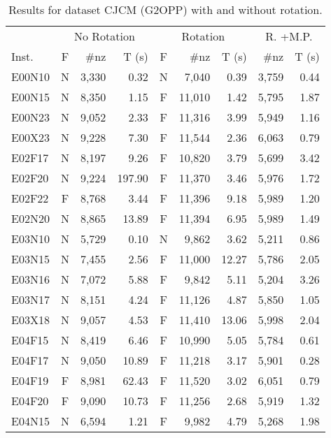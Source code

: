 \begin{table}[htpb]
\centering
\caption{Results for dataset CJCM (G2OPP) with and without rotation.}
\label{tab:g2opp_cjcm_joined}
\begin{tabular}{lcrrcrrrr}
\hline\hline
 & \multicolumn{3}{c}{No Rotation} & \multicolumn{3}{c}{Rotation} & \multicolumn{2}{c}{R. +M.P.}\\\cmidrule(lr){2-4}\cmidrule(lr){5-7}\cmidrule(lr){8-9}
Inst. & F & \#nz & T (s) & F & \#nz & T (s) & \#nz & T (s) \\\hline
E00N10 & N & 3,330 & 0.32 & N & 7,040 & 0.39 & 3,759 & 0.44 \\
E00N15 & N & 8,350 & 1.15 & F & 11,010 & 1.42 & 5,795 & 1.87 \\
E00N23 & N & 9,052 & 2.33 & F & 11,316 & 3.99 & 5,949 & 1.16 \\
E00X23 & N & 9,228 & 7.30 & F & 11,544 & 2.36 & 6,063 & 0.79 \\
E02F17 & N & 8,197 & 9.26 & F & 10,820 & 3.79 & 5,699 & 3.42 \\
E02F20 & N & 9,224 & 197.90 & F & 11,370 & 3.46 & 5,976 & 1.72 \\
E02F22 & F & 8,768 & 3.44 & F & 11,396 & 9.18 & 5,989 & 1.20 \\
E02N20 & N & 8,865 & 13.89 & F & 11,394 & 6.95 & 5,989 & 1.49 \\
E03N10 & N & 5,729 & 0.10 & N & 9,862 & 3.62 & 5,211 & 0.86 \\
E03N15 & N & 7,455 & 2.56 & F & 11,000 & 12.27 & 5,786 & 2.05 \\
E03N16 & N & 7,072 & 5.88 & F & 9,842 & 5.11 & 5,204 & 3.26 \\
E03N17 & N & 8,151 & 4.24 & F & 11,126 & 4.87 & 5,850 & 1.05 \\
E03X18 & N & 9,057 & 4.53 & F & 11,410 & 13.06 & 5,998 & 2.04 \\
E04F15 & N & 8,419 & 6.46 & F & 10,990 & 5.05 & 5,784 & 0.61 \\
E04F17 & N & 9,050 & 10.89 & F & 11,218 & 3.17 & 5,901 & 0.28 \\
E04F19 & F & 8,981 & 62.43 & F & 11,520 & 3.02 & 6,051 & 0.79 \\
E04F20 & F & 9,090 & 10.73 & F & 11,256 & 2.68 & 5,919 & 1.32 \\
E04N15 & N & 6,594 & 1.21 & F & 9,982 & 4.79 & 5,268 & 1.98 \\

\end{tabular}
\end{table}
